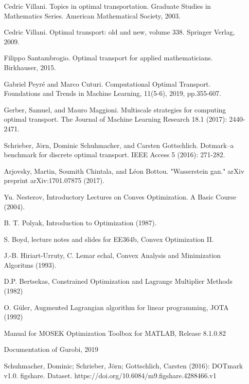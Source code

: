 \newpage

\begin{thebibliography}{1}

  Cedric Villani. Topics in optimal transportation. Graduate Studies in Mathematics Series. American Mathematical Society, 2003.

  Cedric Villani. Optimal transport: old and new, volume 338. Springer Verlag, 2009.

  Filippo Santambrogio. Optimal transport for applied mathematicians. Birkhauser, 2015.

  Gabriel Peyré and Marco Cuturi. Computational Optimal Transport. Foundations and Trends in Machine Learning, 11(5-6), 2019, pp.355-607.
  
  Gerber, Samuel, and Mauro Maggioni. Multiscale strategies for computing optimal transport. The Journal of Machine Learning Research 18.1 (2017): 2440-2471.

  Schrieber, Jörn, Dominic Schuhmacher, and Carsten Gottschlich. Dotmark–a benchmark for discrete optimal transport. IEEE Access 5 (2016): 271-282.

  Arjovsky, Martin, Soumith Chintala, and Léon Bottou. "Wasserstein gan." arXiv preprint arXiv:1701.07875 (2017).

  Yu. Nesterov, Introductory Lectures on Conves Optimization. A
  Basic Course (2004).

  B. T. Polyak, Introduction to Optimization (1987).

  S. Boyd, lecture notes and slides for EE364b, Convex Optimization II.

  J.-B. Hiriart-Urruty, C. Lemar echal, Convex Analysis and
Minimization Algoritms (1993).

  D.P. Bertsekas, Constrained Optimization and Lagrange
Multiplier Methods (1982)

  O. Güler, Augmented Lagrangian algorithm for linear
programming, JOTA (1992)

  Manual for MOSEK Optimization Toolbox for MATLAB, Release 8.1.0.82

  Documentation of Gurobi, 2019
  
  Schuhmacher, Dominic; Schrieber, Jörn; Gottschlich, Carsten (2016): 
    DOTmark v1.0. figshare. Dataset. 
    https://doi.org/10.6084/m9.figshare.4288466.v1

\end{thebibliography}